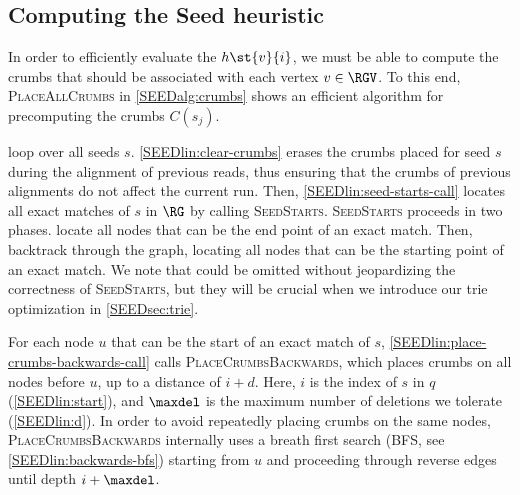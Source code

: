 

\subsection{Computing the Seed heuristic} \label{SEEDsec:algo}
%
In order to efficiently evaluate the \seedh $h\st{v}{i}$, we must be
able to compute the crumbs that should be associated with each vertex $v \in
\RGV$.
%
To this end, \textsc{PlaceAllCrumbs} in \cref{SEEDalg:crumbs} shows an efficient
algorithm for precomputing the crumbs $C(s_j)$.

 loop over all seeds $s$.
\cref{SEEDlin:clear-crumbs} erases the crumbs placed for seed $s$ during the
alignment of previous reads, thus ensuring that the crumbs of previous
alignments do not affect the current run. Then, \cref{SEEDlin:seed-starts-call}
locates all exact matches of $s$ in $\RG$ by calling \textsc{SeedStarts}.
\textsc{SeedStarts} proceeds in two phases.
 locate all nodes that can be
the end point of an exact match. Then,
 backtrack through
the graph, locating all nodes that can be the starting point of an exact match.
We note that  could be
omitted without jeopardizing the correctness of \textsc{SeedStarts}, but they
will be crucial when we introduce our trie optimization in \cref{SEEDsec:trie}.

For each node $u$ that can be the start of an exact match of $s$,
\cref{SEEDlin:place-crumbs-backwards-call} calls \textsc{PlaceCrumbsBackwards},
which places crumbs on all nodes before $u$, up to a distance of $i{+}d$. Here,
$i$ is the index of $s$ in $q$ (\cref{SEEDlin:start}), and $\maxdel$ is the maximum
number of deletions we tolerate (\cref{SEEDlin:d}).
%
In order to avoid repeatedly placing crumbs on the same nodes,
\textsc{PlaceCrumbsBackwards} internally uses a breath first search (BFS, see
\cref{SEEDlin:backwards-bfs}) starting from $u$ and proceeding through reverse edges
until depth $i + \maxdel$.